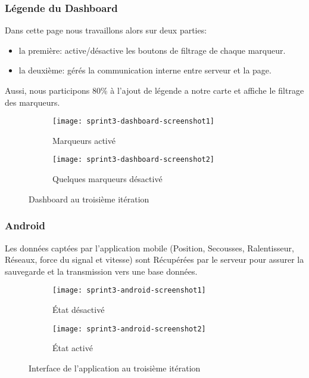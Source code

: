 \subsubsection{Légende du Dashboard}

Dans cette page nous travaillons alors sur deux parties:

\begin{itemize}
    \item la première: active/désactive les boutons de filtrage de chaque
        marqueur.
    \item la deuxième: gérés la communication interne entre serveur et la page.
\end{itemize}

Aussi, nous participons 80\% à l'ajout de légende a notre carte et affiche le
filtrage des marqueurs.

\begin{figure}[H]
\centering
    \begin{subfigure}{.7\textwidth}
    \centering
  \centering
  \texttt{[image: sprint3-dashboard-screenshot1]}
  \caption{Marqueurs activé}
\label{fig:sprint3-dashboard-screenshot1}
\end{subfigure}
\begin{subfigure}{.7\textwidth}
    \centering
  \centering
  \texttt{[image: sprint3-dashboard-screenshot2]}
  \caption{Quelques marqueurs désactivé}
\label{sprint3-dashboard-screenshot2}
\end{subfigure}
\caption{Dashboard  au troisième itération}
\end{figure}

\subsubsection{Android}

Les données captées par l'application mobile (Position, Secousses,
Ralentisseur, Réseaux, force du signal et vitesse) sont Récupérées par le
serveur pour assurer la sauvegarde et la transmission vers une base données.

\begin{figure}[H]
\centering
    \begin{subfigure}{.4\textwidth}
    \centering
  \centering
  \texttt{[image: sprint3-android-screenshot1]}
  \caption{État désactivé}
\label{fig:sprint3-android-screenshot1}
\end{subfigure}
\begin{subfigure}{.4\textwidth}
    \centering
  \centering
  \texttt{[image: sprint3-android-screenshot2]}
  \caption{État activé}
\label{fig:sprint3-android-screenshot2}
\end{subfigure}
\caption{Interface de l'application au troisième itération}
\end{figure}


